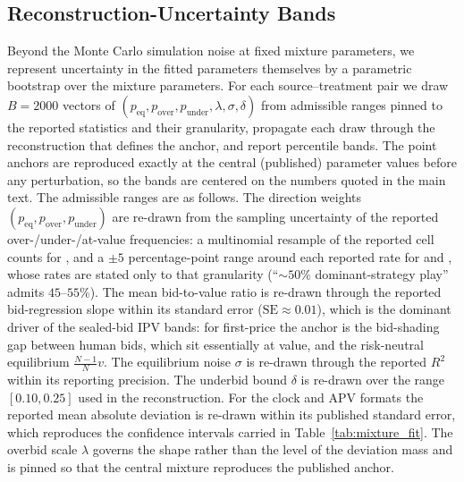 \documentclass{article} %
\newif\ifmarkrev
\newcommand{\rev}[1]{\ifmarkrev\begingroup\color{red}#1\endgroup\else#1\fi}
\begin{document}
\subsection{\texorpdfstring{\rev{Reconstruction-Uncertainty Bands}}{Reconstruction-Uncertainty Bands}}\label{app:bands}

\rev{Beyond the Monte Carlo simulation noise at fixed mixture parameters, we represent uncertainty in the fitted parameters themselves by a parametric bootstrap over the mixture parameters. For each source--treatment pair we draw $B=2000$ vectors of $(p_{\text{eq}}, p_{\text{over}}, p_{\text{under}}, \lambda, \sigma, \delta)$ from admissible ranges pinned to the reported statistics and their granularity, propagate each draw through the reconstruction that defines the anchor, and report percentile bands. The point anchors are reproduced exactly at the central (published) parameter values before any perturbation, so the bands are centered on the numbers quoted in the main text. The admissible ranges are as follows. The direction weights $(p_{\text{eq}}, p_{\text{over}}, p_{\text{under}})$ are re-drawn from the sampling uncertainty of the reported over-/under-/at-value frequencies: a multinomial resample of the reported cell counts for \citet{kagel1993independent}, and a $\pm 5$ percentage-point range around each reported rate for \citet{li2017obviously} and \citet{breitmoser2022obviousness}, whose rates are stated only to that granularity (``${\sim}50\%$ dominant-strategy play'' admits $45$--$55\%$). The mean bid-to-value ratio is re-drawn through the reported bid-regression slope within its standard error ($\mathrm{SE}\approx 0.01$), which is the dominant driver of the sealed-bid IPV bands: for first-price the anchor is the bid-shading gap between human bids, which sit essentially at value, and the risk-neutral equilibrium $\tfrac{N-1}{N}v$. The equilibrium noise $\sigma$ is re-drawn through the reported $R^2$ within its reporting precision. The underbid bound $\delta$ is re-drawn over the range $[0.10, 0.25]$ used in the reconstruction. For the clock and APV formats the reported mean absolute deviation is re-drawn within its published standard error, which reproduces the confidence intervals carried in Table~\ref{tab:mixture_fit}. The overbid scale $\lambda$ governs the shape rather than the level of the deviation mass and is pinned so that the central mixture reproduces the published anchor.}
\end{document}
